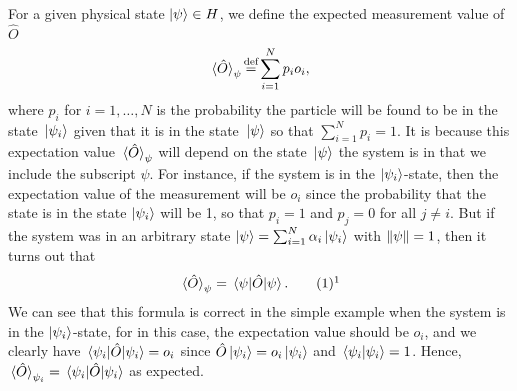 For a given physical state $\ket{\psi}\in H$, we define the expected measurement value of $\hat{O}$
\begin{equation}\label{expectation2}
\ev*{\hat{O}}_\psi\myeq\sum_{i=1}^N p_io_i,
\end{equation}
where $p_i$ for $i=1,\ldots, N$ is the probability the particle will be found to be in the state $\ket*{\psi_i}$ given that it is in the state $\ket*{\psi}$ so that  $\sum_{i=1}^N p_i=1$. It is because this expectation value $\ev*{\hat{O}}_\psi$ will depend on the state $\ket*{\psi}$ the system is in that we include the subscript $\psi$. For instance, if the system is in the $\ket{\psi_i}$-state, then the expectation value of the measurement will be $o_i$ since the probability that the state is in the state $\ket{\psi_i}$ will be 1, so that $p_i=1$ and $p_j=0$ for all $j\neq i$. But if the system was in an arbitrary state $\ket{\psi}=\sum_{i=1}^N \alpha_i\ket{\psi_i}$ with $\norm{\psi}=1$, then it turns out that 
\begin{equation}\refstepcounter{equation}\label{evev}\ev*{\hat{O}}_\psi=\ev*{\hat{O}}{\psi}.\tag{\theequation}\protect\footnotemark
\end{equation}We can see that this formula is correct in the simple example when the system is in the $\ket{\psi_i}$-state, for in this case, the expectation value should be $o_i$, and we clearly have $\ev*{\hat{O}}{\psi_i}=o_i$ since $\hat{O}\ket{\psi_i}=o_i\ket{\psi_i}$ and $\ip*{\psi_i}=1$. Hence, $\ev*{\hat{O}}_{\psi_i}=\ev*{\hat{O}}{\psi_i}$ as expected.

